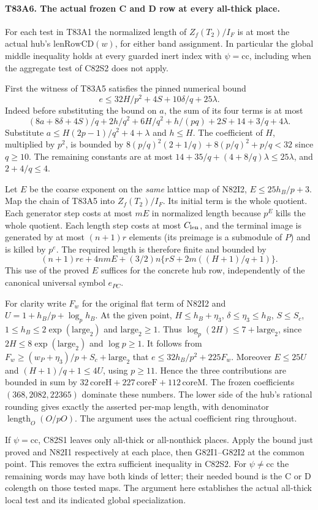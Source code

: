 \paragraph{T83A6. The actual frozen C and D row at every all-thick place.}
For each test in T83A1 the normalized length of
$Z_f(T_2)/I_F$ is at most the actual hub's $\mathrm{lenRowCD}(w)$,
for either band assignment. In particular the global middle
inequality holds at every guarded inert index with
$\psi=\mathrm{cc}$, including when the aggregate test of C82S2
does not apply.

First the witness of T83A5 satisfies the pinned numerical bound
\[
            e\le 32H/p^2+4S+10\delta/q+25\lambda .
\]
Indeed before substituting the bound on $a$, the sum of its four
terms is at most
\[
 (8a+8\delta+4S)/q+2h/q^2+6H/q^2+
 h/(pq)+2S+14+3/q+4\lambda .
\]
Substitute $a\le H(2p-1)/q^2+4+\lambda$ and $h\le H$.
The coefficient of $H$, multiplied by $p^2$, is bounded by
$8(p/q)^2(2+1/q)+8(p/q)^2+p/q<32$ since $q\ge10$.
The remaining constants are at most
$14+35/q+(4+8/q)\lambda\le25\lambda$, and $2+4/q\le4$.

Let $E$ be the coarse exponent on the \emph{same} lattice map
of N82I2, $E\le25h_B/p+3$. Map the chain of T83A5 into
$Z_f(T_2)/I_F$. Its initial term is the whole quotient. Each
generator step costs at most $m E$ in normalized length because
$p^E$ kills the whole quotient. Each length step costs at most
$C_{\rm len}$, and the terminal image is generated by at most
$(n+1)r$ elements (its preimage is a submodule of $P$) and is
killed by $p^e$. The required length is therefore finite and
bounded by
\[
       (n+1)r e+4nm E+(3/2)n\{rS+2m((H+1)/q+1)\}.
\]
This use of the proved $E$ suffices for the concrete hub row,
independently of the canonical universal symbol $e_{PC}$.

For clarity write $F_w$ for the original flat term of N82I2 and
$U=1+h_B/p+\log_p h_B$. At the given point,
$H\le h_B+\eta_3$, $\delta\le\eta_3\le h_B$,
$S\le S_c$, $1\le h_B\le2\exp(\mathrm{large}_2)$ and
$\mathrm{large}_2\ge1$. Thus
$\log_p(2H)\le7+\mathrm{large}_2$, since
$2H\le8\exp(\mathrm{large}_2)$ and $\log p\ge1$.
It follows from $F_w\ge(w_P+\eta_3)/p+S_c+\mathrm{large}_2$
that $e\le32h_B/p^2+225 F_w$. Moreover
$E\le25U$ and $(H+1)/q+1\le4U$, using $p\ge11$.
Hence the three contributions are bounded in sum by
$32\,\mathrm{coreH}+227\,\mathrm{coreF}
 +112\,\mathrm{coreM}$. The frozen coefficients
$(368,2082,22365)$ dominate these numbers. The lower side of
the hub's rational rounding gives exactly the asserted per-map
length, with denominator $\operatorname{length}_O(O/pO)$.
The argument uses the actual coefficient ring throughout.

If $\psi=\mathrm{cc}$, C82S1 leaves only all-thick or all-nonthick
places. Apply the bound just proved and N82I1 respectively at
each place, then G82I1--G82I2 at the common point. This removes
the extra sufficient inequality in C82S2. For $\psi\ne\mathrm{cc}$
the remaining words may have both kinds of letter; their needed
bound is the C or D colength on those tested maps. The argument
here establishes the actual all-thick local test and its indicated
global specialization.
